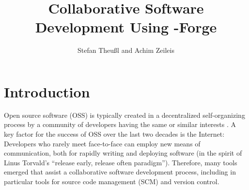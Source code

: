 \title{Collaborative Software Development Using \R{}-Forge}
\author{Stefan Theu\ss{}l and Achim Zeileis}

\maketitle



\newcommand{\tab}[1]{{\normalfont\textit{#1}}}

\section*{Introduction}

Open source software (OSS) is typically created in a decentralized
self-organizing process by a community of developers having the same
or similar interests \citep[see the famous essay by][]{forge:Raymond:1999}.
A key factor for the success of OSS over the last two decades is the
Internet: Developers who rarely meet face-to-face can employ new means
of communication, both for rapidly writing and deploying software
(in the spirit of Linus Torvald's ``release early, release often paradigm'').
Therefore, many tools emerged that assist a collaborative software
development process, including in particular tools for source code
management (SCM) and version control.

